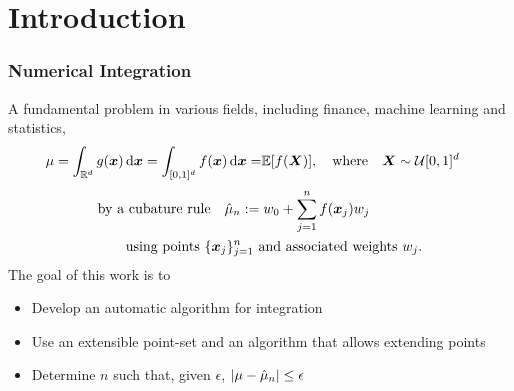 \documentclass[handout, 10pt,compress,xcolor={usenames,dvipsnames}]{beamer} %
\newcommand{\Ex}{\mathbb{E}}
\newcommand{\errtol}{{\epsilon}}
\newcommand{\pause}{}
\def\abs#1{\ensuremath{\left \lvert #1 \right \rvert}}
\begin{document}
\section{Introduction}
\frame
{
\frametitle{Numerical Integration}
\vspace{-5ex}
A fundamental problem in various fields, including finance, machine learning and statistics,
\vspace{-2ex}
\begin{align}
\label{eqn:defn_mu}
\mu = \int_{\reals^d} g(\vx) \,  \dif \vx = \int_{[0,1]^d} f(\vx) \,
\dif\vx  = & \Ex[f(\vX)], \quad \text{where} \quad \vX \sim \cu [0,1]^d
\end{align}
\vspace{-5ex}
\begin{align*}
 &\text{by a  cubature rule} \quad
\hmu_n := w_0 + \sum_{j=1}^{n} f(\vx_j) w_j \qquad
\\  \vspace{-2ex}
& \qquad \text{using  points $\{\vx_j \}_{j=1}^{n}$ and associated weights $w_j$.}
\end{align*}
\vspace{-1ex}
\pause %
The goal of this work is to
\vspace{-2ex}
\begin{itemize}
\item Develop an automatic algorithm for integration
\item Use an \alert{extensible} point-set and an algorithm that allows extending points 
\item Determine \alert{$n$} such that, given \alert{$\errtol$}, $\abs{\mu-\hmu_n} \leq \errtol$
\end{itemize}
}
\end{document}
